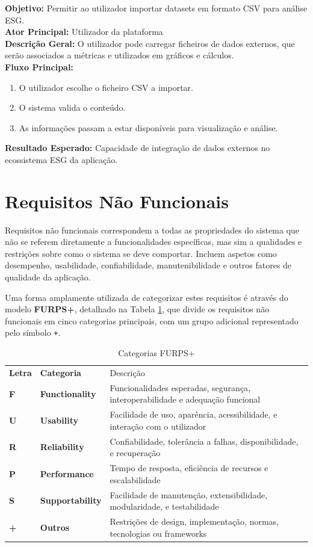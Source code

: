 \textbf{Objetivo:} Permitir ao utilizador importar datasets em formato CSV para análise ESG.\\
\textbf{Ator Principal:} Utilizador da plataforma\\
\textbf{Descrição Geral:} O utilizador pode carregar ficheiros de dados externos, que serão associados a métricas e utilizados em gráficos e cálculos.\\
\textbf{Fluxo Principal:}
\begin{enumerate}
    \item O utilizador escolhe o ficheiro CSV a importar.
    \item O sistema valida o conteúdo.
    \item As informações passam a estar disponíveis para visualização e análise.
\end{enumerate}
\textbf{Resultado Esperado:} Capacidade de integração de dados externos no ecossistema ESG da aplicação.


\section{Requisitos Não Funcionais}

Requisitos não funcionais correspondem a todas as propriedades do sistema que não se referem diretamente a funcionalidades específicas, mas sim a qualidades e restrições sobre como o sistema se deve comportar. Incluem aspetos como desempenho, usabilidade, confiabilidade, manutenibilidade e outros fatores de qualidade da aplicação.

Uma forma amplamente utilizada de categorizar estes requisitos é através do modelo \textbf{FURPS+}, detalhado na Tabela \ref{tab:furps}, que divide os requisitos não funcionais em cinco categorias principais, com um grupo adicional representado pelo símbolo \texttt{+}.

\begin{table}[H]
    \renewcommand{\arraystretch}{1.2}
    \setlength{\tabcolsep}{10pt}
    \centering
    \begin{tabular}{>{\bfseries}p{1cm} >{\bfseries}p{2.5cm} p{10cm}}
        \rowcolor{blue!50}
        Letra & Categoria & Descrição \\
        F & Functionality & Funcionalidades esperadas, segurança, interoperabilidade e adequação funcional \\
        U & Usability & Facilidade de uso, aparência, acessibilidade, e interação com o utilizador \\
        R & Reliability & Confiabilidade, tolerância a falhas, disponibilidade, e recuperação \\
        P & Performance & Tempo de resposta, eficiência de recursos e escalabilidade \\
        S & Supportability & Facilidade de manutenção, extensibilidade, modularidade, e testabilidade \\
        + & Outros & Restrições de design, implementação, normas, tecnologias ou frameworks \\
    \end{tabular}
    \caption{Categorias FURPS+}
    \label{tab:furps}
\end{table}

